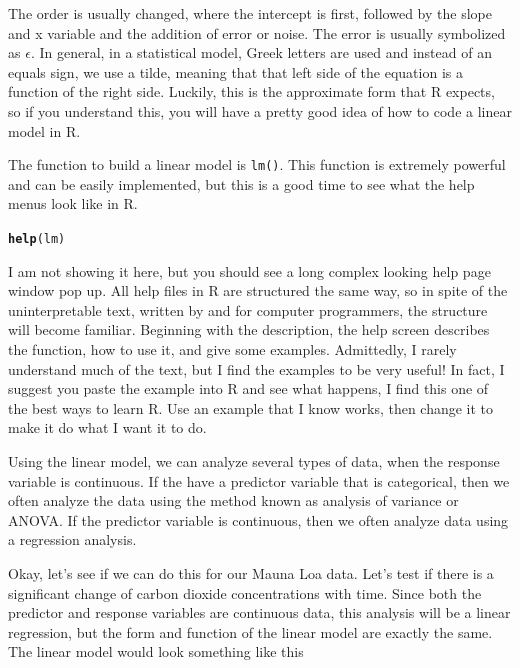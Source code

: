 \documentclass{article}\usepackage[]{graphicx}\usepackage[]{color}
\makeatletter
\newcommand{\hlstd}[1]{\textcolor[rgb]{0.345,0.345,0.345}{#1}}%
\newcommand{\hlkwd}[1]{\textcolor[rgb]{0.737,0.353,0.396}{\textbf{#1}}}%
\newenvironment{kframe}{%
 \def\at@end@of@kframe{}%
 \ifinner\ifhmode%
  \def\at@end@of@kframe{\end{minipage}}%
  \begin{minipage}{\columnwidth}%
 \fi\fi%
 \def\FrameCommand##1{\hskip\@totalleftmargin \hskip-\fboxsep
 \colorbox{shadecolor}{##1}\hskip-\fboxsep
     \hskip-\linewidth \hskip-\@totalleftmargin \hskip\columnwidth}%
 \MakeFramed {\advance\hsize-\width
   \@totalleftmargin\z@ \linewidth\hsize
   \@setminipage}}%
 {\par\unskip\endMakeFramed%
 \at@end@of@kframe}
\newenvironment{knitrout}{}{} %
\makeatother
\begin{document}
The order is usually changed, where the intercept is first, followed by the slope and x variable and the addition of error or noise. The error is usually symbolized as $\epsilon$. In general, in a statistical model, Greek letters are used and instead of an equals sign, we use a tilde, meaning that that left side of the equation is a function of the right side. Luckily, this is the approximate form that R expects, so if you understand this, you will have a pretty good idea of how to code a linear model in R. 

The function to build a linear model is \texttt{lm()}. This function is extremely powerful and can be easily implemented, but this is a good time to see what the help menus look like in R. 

\begin{knitrout}
\color{fgcolor}\begin{kframe}
\begin{alltt}
\hlkwd{help}\hlstd{(lm)}
\end{alltt}
\end{kframe}
\end{knitrout}

I am not showing it here, but you should see a long complex looking help page window pop up. All help files in R are structured the same way, so in spite of the uninterpretable text, written by and for computer programmers, the structure will become familiar. Beginning with the description, the help screen describes the function, how to use it, and give some examples. Admittedly, I rarely understand much of the text, but I find the examples to be very useful! In fact, I suggest you paste the example into R and see what happens, I find this one of the best ways to learn R. Use an example that I know works, then change it to make it do what I want it to do.

Using the linear model, we can analyze several types of data, when the response variable is continuous. If the have a predictor variable that is categorical, then we often analyze the data using the method known as analysis of variance or ANOVA. If the predictor variable is continuous, then we often analyze data using a regression analysis. 

Okay, let's see if we can do this for our Mauna Loa data. Let's test if there is a significant change of carbon dioxide concentrations with time. Since both the predictor and response variables are continuous data, this analysis will be a linear regression, but the form and function of the linear model are exactly the same. The linear model would look something like this
\end{document}
